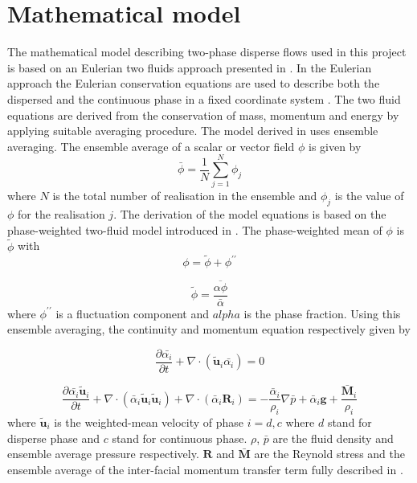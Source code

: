 \documentclass[
10pt, %
a4paper, %
oneside, %
headinclude,footinclude, %
BCOR5mm, %
]{scrartcl}
\begin{document}
\section{Mathematical model}
The mathematical model describing two-phase disperse flows used in this project is based on an Eulerian two fluids approach presented in \cite{behzadi:2003}. In the Eulerian approach the Eulerian conservation equations are used to describe both the dispersed and the continuous phase in a fixed coordinate system \cite{Hill:1998}. The two fluid equations are derived from the conservation of mass, momentum and energy by applying suitable averaging procedure. The model derived in \cite{behzadi:2003} uses ensemble averaging. The ensemble average of a scalar or vector field $\phi$ is given by
\begin{equation}
\bar{\phi} = \frac{1}{N}\sum_{j=1}^{N}{\phi_{j}} \nonumber
\end{equation}
where $N$ is the total number of realisation in the ensemble and $\phi_{j}$ is the value of $\phi$
for the realisation $j$. The derivation of the model equations is based on  the phase-weighted two-fluid model introduced in \cite{Ishii:1975}. The phase-weighted mean of $\phi$ is $\tilde{\phi}$ with 
\begin{equation}
\phi = \tilde{\phi}+\phi^{\prime\prime}\nonumber
\end{equation}

\begin{equation}
\tilde{\phi} = \frac{\overline{\alpha\phi}}{\bar{\alpha}}\nonumber
\end{equation}
where $\phi^{\prime\prime}$ is a fluctuation component and $alpha$ is the phase fraction. Using this ensemble averaging, the continuity and momentum equation respectively given by

\begin{equation}
\frac{\partial \bar{\alpha_{i}}}{\partial t}+\nabla\cdot(\tilde{\textbf{u}}_{i}\bar{\alpha_{i}}) = 0
\end{equation}

\begin{equation}
\frac{\partial \bar{\alpha_{i}} \tilde{\textbf{u}}_{i}}{\partial t}+\nabla\cdot(\bar{\alpha}_{i}\tilde{\textbf{u}}_{i}\tilde{\textbf{u}}_{i})+\nabla\cdot(\bar{\alpha}_{i}
\textbf{R}_{i}) =-\frac{\bar{\alpha}_{i}}{\rho_{i}}\nabla\bar{p}+\bar{\alpha}_{i}\textbf{g}+
\frac{\bar{\textbf{M}}_{i}}{\rho_{i}}
\end{equation}
where $\tilde{\textbf{u}}_{i}$ is the weighted-mean velocity of phase $i = d,c$ where $d$ stand for disperse phase and $c$ stand for continuous phase. $\rho$, $\bar{p}$ are the fluid density and ensemble average pressure respectively. $\textbf{R}$ and $\bar{\textbf{M}}$ are the Reynold stress and the ensemble average of the inter-facial momentum transfer term fully described in \cite{behzadi:2003}. 
\end{document}
